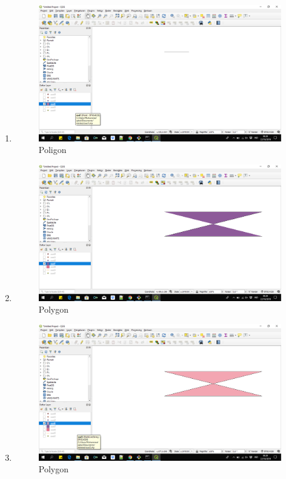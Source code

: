 \begin{enumerate}
	\item 
	
	\begin{figure}[H]
		\includegraphics[width=12cm]{figures/1174063/6.PNG}
		\centering
		\caption{Poligon}
	\end{figure}
	
	\item 
	
	\begin{figure}[H]
		\includegraphics[width=12cm]{figures/1174063/7.PNG}
		\centering
		\caption{Polygon}
	\end{figure}
	
	\item 
	
	\begin{figure}[H]
		\includegraphics[width=12cm]{figures/1174063/8.PNG}
		\centering
		\caption{Polygon}
	\end{figure}
	

\end{enumerate}
